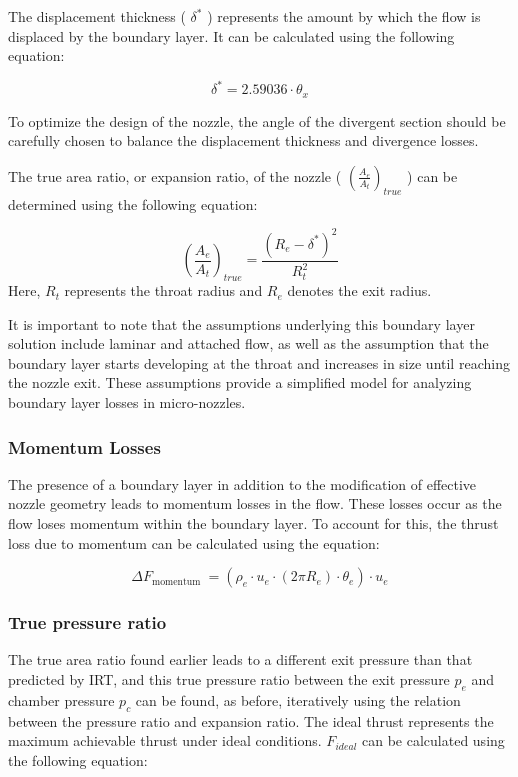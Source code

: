 \documentclass{homework}
\begin{document}
\begin{multicols}{2}
		  The displacement thickness ( $\delta^*$ ) represents the amount by which the flow is displaced by the boundary layer. It can be calculated using the following equation:  
		    
		  $$\delta^*=2.59036 \cdot \theta_x$$  
		    
		  To optimize the design of the nozzle, the angle of the divergent section should be carefully chosen to balance the displacement thickness and divergence losses.  
		    
		  The true area ratio, or expansion ratio, of the nozzle ( $\left(\frac{A_e}{A_t}\right)_{t r u e}$ ) can be determined using the following equation:  
		    
$$\left(\frac{A_e}{A_t}\right)_{t r u e}=\frac{\left(R_e-\delta^*\right)^2}{R_t^2}$$ 		    
		  Here, $R_t$ represents the throat radius and $R_e$ denotes the exit radius.  
		    
		  It is important to note that the assumptions underlying this boundary layer solution include laminar and attached flow, as well as the assumption that the boundary layer starts developing at the throat and increases in size until reaching the nozzle exit. These assumptions provide a simplified model for analyzing boundary layer losses in micro-nozzles.  
\subsubsection{Momentum Losses}
		    
		  The presence of a boundary layer in addition to the modification of effective nozzle geometry leads to momentum losses in the flow. These losses occur as the flow loses momentum within the boundary layer. To account for this, the thrust loss due to momentum can be calculated using the equation:  
		    
		  $$\Delta F_{\text {momentum }}=\left(\rho_e \cdot u_e \cdot\left(2 \pi R_e\right) \cdot \theta_e\right) \cdot u_e$$ 
    
\subsubsection{True pressure ratio}
		    
		  The true area ratio found earlier leads to a different exit pressure than that predicted by IRT, and this true pressure ratio between the exit pressure $p_e$ and chamber pressure $p_c$ can be found, as before, iteratively using the relation between the pressure ratio and expansion ratio.  
The ideal thrust represents the maximum achievable thrust under ideal conditions. $F_{ideal}$ can be calculated using the following equation:
		    

\end{multicols}
\end{document}
